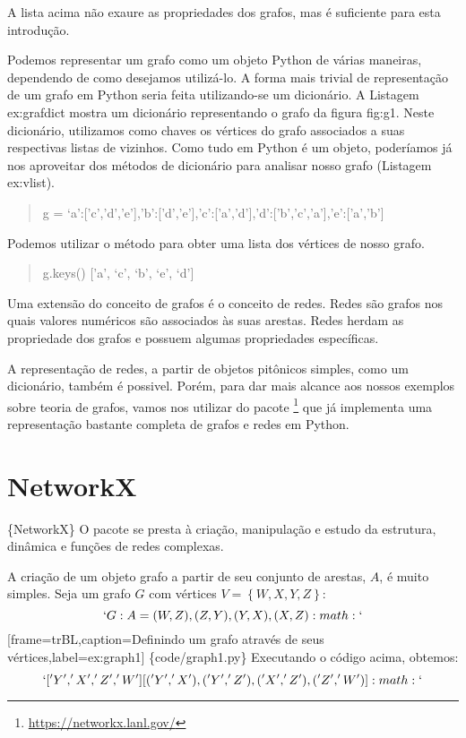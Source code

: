 \documentclass[a4paper,10pt,brazil]{sphinxmanual}
\begin{document}
A lista acima não exaure as propriedades dos grafos, mas é
suficiente para esta introdução.

Podemos representar um grafo como um objeto Python de várias
maneiras, dependendo de como desejamos utilizá-lo. A forma mais
trivial de representação de um grafo em Python seria feita
utilizando-se um dicionário. A Listagem ex:grafdict mostra um
dicionário representando o grafo da figura fig:g1. Neste
dicionário, utilizamos como chaves os vértices do grafo associados
a suas respectivas listas de vizinhos. Como tudo em Python é um
objeto, poderíamos já nos aproveitar dos métodos de dicionário para
analisar nosso grafo (Listagem ex:vlist).
\begin{quote}

g =
`a':{[}'c','d','e'{]},'b':{[}'d','e'{]},'c':{[}'a','d'{]},'d':{[}'b','c','a'{]},'e':{[}'a','b'{]}
\end{quote}

Podemos utilizar o método  para obter uma lista dos
vértices de nosso grafo.
\begin{quote}

g.keys() {[}'a', `c', `b', `e', `d'{]}
\end{quote}

Uma extensão do conceito de grafos é o conceito de redes. Redes são
grafos nos quais valores numéricos são associados às suas arestas.
Redes herdam as propriedade dos grafos e possuem algumas
propriedades específicas.

A representação de redes, a partir de objetos pitônicos simples,
como um dicionário, também é possivel. Porém, para dar mais alcance
aos nossos exemplos sobre teoria de grafos, vamos nos utilizar do
pacote  \footnote{
\href{https://networkx.lanl.gov/}{https://networkx.lanl.gov/}
} que já implementa uma representação
bastante completa de grafos e redes em Python.


\chapter{NetworkX}
\label{capgraph:networkx}
\{NetworkX\} O pacote  se presta à criação, manipulação e
estudo da estrutura, dinâmica e funções de redes complexas.

A criação de um objeto grafo a partir de seu conjunto de arestas,
$A$, é muito simples. Seja um grafo $G$ com
vértices $V=\left\lbrace W,X,Y,Z\right\rbrace $:
$$`G:A= (W,Z),(Z,Y),(Y,X),(X,Z) :math:`$$
{[}frame=trBL,caption=Definindo um grafo através de seus vértices,label=ex:graph1{]} \{code/graph1.py\}
Executando o código acima, obtemos: $$`['Y', 'X', 'Z', 'W']
[('Y', 'X'), ('Y', 'Z'), ('X', 'Z'), ('Z', 'W')]:math:`$$
\end{document}
